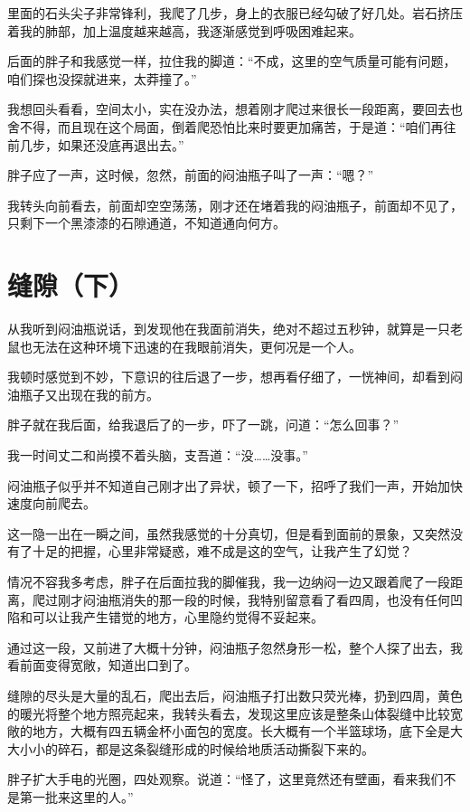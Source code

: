 里面的石头尖子非常锋利，我爬了几步，身上的衣服已经勾破了好几处。岩石挤压着我的肺部，加上温度越来越高，我逐渐感觉到呼吸困难起来。

后面的胖子和我感觉一样，拉住我的脚道：“不成，这里的空气质量可能有问题，咱们探也没探就进来，太莽撞了。”

我想回头看看，空间太小，实在没办法，想着刚才爬过来很长一段距离，要回去也舍不得，而且现在这个局面，倒着爬恐怕比来时要更加痛苦，于是道：“咱们再往前几步，如果还没底再退出去。”

胖子应了一声，这时候，忽然，前面的闷油瓶子叫了一声：“嗯？”

我转头向前看去，前面却空空荡荡，刚才还在堵着我的闷油瓶子，前面却不见了，只剩下一个黑漆漆的石隙通道，不知道通向何方。

\chapter{缝隙（下）}

从我听到闷油瓶说话，到发现他在我面前消失，绝对不超过五秒钟，就算是一只老鼠也无法在这种环境下迅速的在我眼前消失，更何况是一个人。

我顿时感觉到不妙，下意识的往后退了一步，想再看仔细了，一恍神间，却看到闷油瓶子又出现在我的前方。

胖子就在我后面，给我退后了的一步，吓了一跳，问道：“怎么回事？”

我一时间丈二和尚摸不着头脑，支吾道：“没……没事。”

闷油瓶子似乎并不知道自己刚才出了异状，顿了一下，招呼了我们一声，开始加快速度向前爬去。

这一隐一出在一瞬之间，虽然我感觉的十分真切，但是看到面前的景象，又突然没有了十足的把握，心里非常疑惑，难不成是这的空气，让我产生了幻觉？

情况不容我多考虑，胖子在后面拉我的脚催我，我一边纳闷一边又跟着爬了一段距离，爬过刚才闷油瓶消失的那一段的时候，我特别留意看了看四周，也没有任何凹陷和可以让我产生错觉的地方，心里隐约觉得不妥起来。

通过这一段，又前进了大概十分钟，闷油瓶子忽然身形一松，整个人探了出去，我看前面变得宽敞，知道出口到了。

缝隙的尽头是大量的乱石，爬出去后，闷油瓶子打出数只荧光棒，扔到四周，黄色的暖光将整个地方照亮起来，我转头看去，发现这里应该是整条山体裂缝中比较宽敞的地方，大概有四五辆金杯小面包的宽度。长大概有一个半篮球场，底下全是大大小小的碎石，都是这条裂缝形成的时候给地质活动撕裂下来的。

胖子扩大手电的光圈，四处观察。说道：“怪了，这里竟然还有壁画，看来我们不是第一批来这里的人。”

